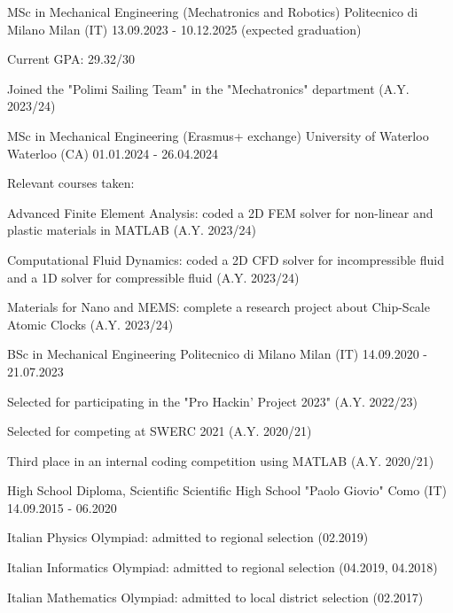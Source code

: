 
\begin{cventries}

  \cventry
  {MSc in Mechanical Engineering (Mechatronics and Robotics)}
  {Politecnico di Milano}
  {Milan (IT)}
  {13.09.2023 - 10.12.2025 (expected graduation)}
  {
    \begin{cvitems}
      \item {Current GPA: 29.32/30}
      \item {Joined the "Polimi Sailing Team" in the "Mechatronics" department (A.Y. 2023/24)}
    \end{cvitems}
  }

  \cventry
  {MSc in Mechanical Engineering (Erasmus+ exchange)}
  {University of Waterloo}
  {Waterloo (CA)}
  {01.01.2024 - 26.04.2024}
  {
    Relevant courses taken:
    \vspace{4mm}
    \begin{cvitems}
      \item {Advanced Finite Element Analysis: coded a 2D FEM solver for non-linear and plastic materials in MATLAB (A.Y. 2023/24)}
      \item {Computational Fluid Dynamics: coded a 2D CFD solver for incompressible fluid and a 1D solver for compressible fluid (A.Y. 2023/24)}
      \item {Materials for Nano and MEMS: complete a research project about Chip-Scale Atomic Clocks (A.Y. 2023/24)}
    \end{cvitems}
  }

  \cventry
  {BSc in Mechanical Engineering}
  {Politecnico di Milano}
  {Milan (IT)}
  {14.09.2020 - 21.07.2023}
  {
    \begin{cvitems}
      \item {Selected for participating in the "Pro Hackin' Project 2023" (A.Y. 2022/23)}
      \item {Selected for competing at SWERC 2021 (A.Y. 2020/21)}
      \item {Third place in an internal coding competition using MATLAB (A.Y. 2020/21)}
    \end{cvitems}
  }

  \cventry
  {High School Diploma, Scientific}
  {Scientific High School "Paolo Giovio"}
  {Como (IT)}
  {14.09.2015 - 06.2020}
  {
    \begin{cvitems}
      \item {Italian Physics Olympiad: admitted to regional selection (02.2019)}
      \item {Italian Informatics Olympiad: admitted to regional selection (04.2019, 04.2018)}
      \item {Italian Mathematics Olympiad: admitted to local district selection (02.2017)}
    \end{cvitems}
  }

\end{cventries}